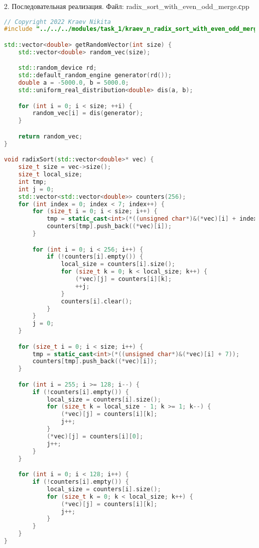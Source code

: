 \documentclass{report}
\begin{document}
\par 2. Последовательная реализация. Файл: radix\_sort\_with\_even\_odd\_merge.сpp

\begin{lstlisting}[language=C++]
// Copyright 2022 Kraev Nikita
#include "../../../modules/task_1/kraev_n_radix_sort_with_even_odd_merge.h"

std::vector<double> getRandomVector(int size) {
    std::vector<double> random_vec(size);

    std::random_device rd;
    std::default_random_engine generator(rd());
    double a = -5000.0, b = 5000.0;
    std::uniform_real_distribution<double> dis(a, b);

    for (int i = 0; i < size; ++i) {
        random_vec[i] = dis(generator);
    }

    return random_vec;
}

void radixSort(std::vector<double>* vec) {
    size_t size = vec->size();
    size_t local_size;
    int tmp;
    int j = 0;
    std::vector<std::vector<double>> counters(256);
    for (int index = 0; index < 7; index++) {
        for (size_t i = 0; i < size; i++) {
            tmp = static_cast<int>(*((unsigned char*)&(*vec)[i] + index));
            counters[tmp].push_back((*vec)[i]);
        }

        for (int i = 0; i < 256; i++) {
            if (!counters[i].empty()) {
                local_size = counters[i].size();
                for (size_t k = 0; k < local_size; k++) {
                    (*vec)[j] = counters[i][k];
                    ++j;
                }
                counters[i].clear();
            }
        }
        j = 0;
    }

    for (size_t i = 0; i < size; i++) {
        tmp = static_cast<int>(*((unsigned char*)&(*vec)[i] + 7));
        counters[tmp].push_back((*vec)[i]);
    }

    for (int i = 255; i >= 128; i--) {
        if (!counters[i].empty()) {
            local_size = counters[i].size();
            for (size_t k = local_size - 1; k >= 1; k--) {
                (*vec)[j] = counters[i][k];
                j++;
            }
            (*vec)[j] = counters[i][0];
            j++;
        }
    }

    for (int i = 0; i < 128; i++) {
        if (!counters[i].empty()) {
            local_size = counters[i].size();
            for (size_t k = 0; k < local_size; k++) {
                (*vec)[j] = counters[i][k];
                j++;
            }
        }
    }
}
\end{lstlisting}
\end{document}
